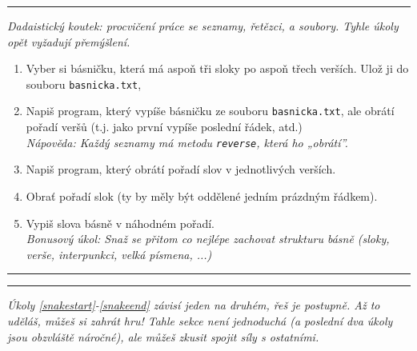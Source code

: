 \documentclass[a4paper,10pt]{article}
\newcommand\startsection[1]{
     \vspace{0.2ex}
    \hrule
    {\fontspec{Oxygen} \tiny
     \vspace{-1ex}
     \emph{#1}
     \vspace{-1.5em}
    }
}
\begin{document}

\startsection{Dadaistický koutek: procvičení práce se seznamy, řetězci,
    a soubory. Tyhle úkoly opět vyžadují přemýšlení.}

\begin{enumerate}[resume]

\item Vyber si básničku, která má aspoň tři sloky po aspoň třech verších.
    Ulož ji do souboru \verb+basnicka.txt+,

\item Napiš program, který vypíše básničku ze souboru \verb+basnicka.txt+,
    ale obrátí pořadí veršů (t.j. jako první vypíše poslední řádek, atd.)
    \\\emph{Nápověda: Každý seznamy má metodu \texttt{reverse}, která ho „obrátí”.}

\item Napiš program, který obrátí pořadí slov v jednotlivých verších.

\item Obrať pořadí slok (ty by měly být oddělené jedním prázdným řádkem).

\item Vypiš slova básně v náhodném pořadí.
    \\\emph{Bonusový úkol: Snaž se přitom co nejlépe zachovat strukturu básně
        (sloky, verše, interpunkci, velká písmena, ...)}

\end{enumerate}

\hrule
\startsection{Úkoly \ref{snakestart}-\ref{snakeend} závisí jeden na druhém,
    řeš je postupně. Až to uděláš, můžeš si zahrát hru!
    Tahle sekce není jednoduchá (a poslední dva úkoly jsou obzvláště náročné),
    ale můžeš zkusit spojit síly s ostatními.}
\end{document}
